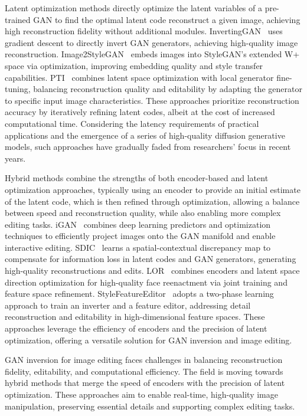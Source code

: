 Latent optimization methods directly optimize the latent variables of a pre-trained GAN to find the optimal latent code reconstruct a given image, achieving high reconstruction fidelity without additional modules. InvertingGAN~\cite{InvertingGAN} uses gradient descent to directly invert GAN generators, achieving high-quality image reconstruction. Image2StyleGAN~\cite{Image2StyleGAN} embeds images into StyleGAN's extended W+ space via optimization, improving embedding quality and style transfer capabilities. PTI~\cite{PTI} combines latent space optimization with local generator fine-tuning, balancing reconstruction quality and editability by adapting the generator to specific input image characteristics.  These approaches prioritize reconstruction accuracy by iteratively refining latent codes, albeit at the cost of increased computational time. 
Considering the latency requirements of practical applications and the emergence of a series of high-quality diffusion generative models, such approaches have gradually faded from researchers' focus in recent years.

Hybrid methods combine the strengths of both encoder-based and latent optimization approaches, typically using an encoder to provide an initial estimate of the latent code, which is then refined through optimization, allowing a balance between speed and reconstruction quality, while also enabling more complex editing tasks. iGAN~\cite{iGAN} combines deep learning predictors and optimization techniques to efficiently project images onto the GAN manifold and enable interactive editing. SDIC~\cite{SDIC} learns a spatial-contextual discrepancy map to compensate for information loss in latent codes and GAN generators, generating high-quality reconstructions and edits. LOR~\cite{LOR} combines encoders and latent space direction optimization for high-quality face reenactment via joint training and feature space refinement. StyleFeatureEditor~\cite{StyleFeatureEditor} adopts a two-phase learning approach to train an inverter and a feature editor, addressing detail reconstruction and editability in high-dimensional feature spaces. These approaches leverage the efficiency of encoders and the precision of latent optimization, offering a versatile solution for GAN inversion and image editing.

GAN inversion for image editing faces challenges in balancing reconstruction fidelity, editability, and computational efficiency. The field is moving towards hybrid methods that merge the speed of encoders with the precision of latent optimization. These approaches aim to enable real-time, high-quality image manipulation, preserving essential details and supporting complex editing tasks.

